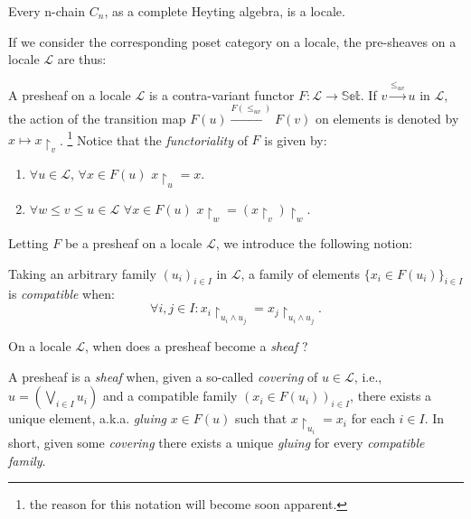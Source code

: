  \begin{ex}
 	Every n-chain $C_n$, as a complete Heyting algebra, is a locale.
 \end{ex}
 
 If we consider the corresponding poset category on a locale, the pre-sheaves on a locale $\mathcal{L}$ are thus:
 
 \begin{definition}[presheaf]
 	A presheaf on a locale $\mathcal{L}$ is a contra-variant functor $F: \mathcal{L} \rightarrow \mathbb{Set}$.\newline
 	If $v \xrightarrow{\leq_{uv}} u$ in $\mathcal{L}$, the action of the transition map $F(u) \xrightarrow{F(\leq_{uv})} F(v)$ on elements is denoted by $x \mapsto x \restriction_v$. \footnote{the reason for this notation will become soon apparent.} \newline
 	Notice that the \emph{functoriality} of $F$ is given by:
 	\begin{enumerate}
 		\item $\forall u \in \mathcal{L}$, $\forall x \in F(u)$ $x \restriction_u = x$.
 		\item $\forall w \leq v \leq u \in \mathcal{L}$ $\forall x \in F(u)$ $x \restriction_w = (x \restriction_v)\restriction_w$. 
 	\end{enumerate}
 \end{definition}
 
 Letting $F$ be a presheaf on a locale $\mathcal{L}$, we introduce the following notion:
 
 \begin{definition}
	Taking an arbitrary family $(u_i)_{i\in I}$ in $\mathcal{L}$, a family of elements $ \{x_i \in F(u_i) \}_{i \in I} $ is \emph{compatible} when:
	\begin{equation*}
		\forall i,j \in I : x_i \restriction_{u_i \land u_j} = x_j \restriction_{u_i \land u_j}.
	\end{equation*}  	
 \end{definition}
 
 
 On a locale $\mathcal{L}$, when does a presheaf become a \emph{sheaf} ?
 
 \begin{definition}[sheaf]
 	A presheaf is a \emph{sheaf} when, given a so-called \emph{covering} of $u \in \mathcal{L}$, i.e., $u= (\bigvee_{i \in I} u_i)$ and  a compatible family $(x_i \in F(u_i))_{i \in I}$, there exists a unique element, a.k.a. \emph{gluing} $x\in F(u)$ such that $x \restriction_{u_i} = x_i$ for each $i\in I$. \newline 
 		In short, given some \emph{covering} there exists a unique \emph{gluing} for every \emph{compatible family}.
 \end{definition}
 

